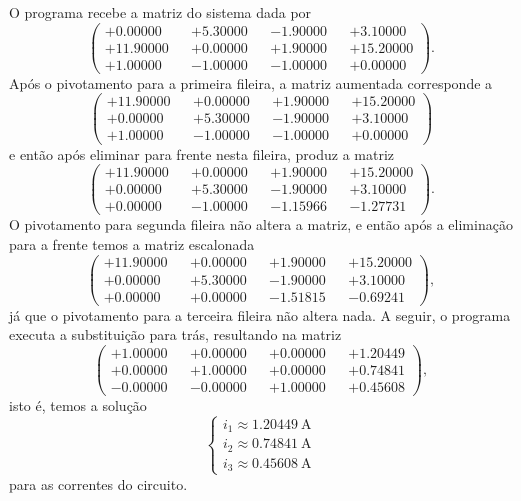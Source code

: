 \documentclass[portuguese,minted]{artigo}
\begin{document}
O programa recebe a matriz do sistema dada por
\begin{equation*}
    \begin{pmatrix}
        +0.00000&&+5.30000&&-1.90000&&+3.10000\\
        +11.90000&&+0.00000&&+1.90000&&+15.20000\\
        +1.00000&&-1.00000&&-1.00000&&+0.00000
    \end{pmatrix}.
\end{equation*}
Após o pivotamento para a primeira fileira, a matriz aumentada corresponde a 
\begin{equation*}
    \begin{pmatrix}
        +11.90000&&+0.00000&&+1.90000&&+15.20000\\
        +0.00000&&+5.30000&&-1.90000&&+3.10000\\
        +1.00000&&-1.00000&&-1.00000&&+0.00000
    \end{pmatrix}
\end{equation*}
e então após eliminar para frente nesta fileira, produz a matriz
\begin{equation*}
    \begin{pmatrix}
        +11.90000&&+0.00000&&+1.90000&&+15.20000\\
        +0.00000&&+5.30000&&-1.90000&&+3.10000\\
        +0.00000&&-1.00000&&-1.15966&&-1.27731
    \end{pmatrix}.
\end{equation*}
O pivotamento para segunda fileira não altera a matriz, e então após a eliminação para a frente temos a matriz escalonada
\begin{equation*}
    \begin{pmatrix}
        +11.90000&&+0.00000&&+1.90000&&+15.20000\\
        +0.00000&&+5.30000&&-1.90000&&+3.10000\\
        +0.00000&&+0.00000&&-1.51815&&-0.69241
    \end{pmatrix},
\end{equation*}
já que o pivotamento para a terceira fileira não altera nada. A seguir, o programa executa a substituição para trás, resultando na matriz
\begin{equation*}
    \begin{pmatrix}
        +1.00000&&+0.00000&&+0.00000&&+1.20449\\
        +0.00000&&+1.00000&&+0.00000&&+0.74841\\
        -0.00000&&-0.00000&&+1.00000&&+0.45608
    \end{pmatrix},
\end{equation*}
isto é, temos a solução
\begin{equation*}
    \begin{cases}
        i_1 \approx \SI{1.20449}{\ampere}\\
        i_2 \approx \SI{0.74841}{\ampere}\\
        i_3 \approx \SI{0.45608}{\ampere}
    \end{cases}
\end{equation*}
para as correntes do circuito.
\end{document}
